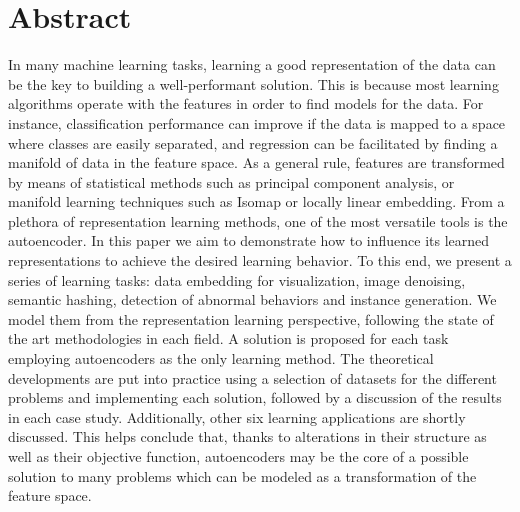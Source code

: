 



\section*{Abstract}
In many machine learning tasks, learning a good representation of the data can be the key to building a well-performant solution. This is because most learning algorithms operate with the features in order to find models for the data. For instance, classification performance can improve if the data is mapped to a space where classes are easily separated, and regression can be facilitated by finding a manifold of data in the feature space. As a general rule, features are transformed by means of statistical methods such as principal component analysis, or manifold learning techniques such as Isomap or locally linear embedding. From a plethora of representation learning methods, one of the most versatile tools is the autoencoder. In this paper we aim to demonstrate how to influence its learned representations to achieve the desired learning behavior. To this end, we present a series of learning tasks: data embedding for visualization, image denoising, semantic hashing, detection of abnormal behaviors and instance generation. We model them from the representation learning perspective, following the state of the art methodologies in each field. A solution is proposed for each task employing autoencoders as the only learning method. The theoretical developments are put into practice using a selection of datasets for the different problems and implementing each solution, followed by a discussion of the results in each case study. Additionally, other six learning applications are shortly discussed. This helps conclude that, thanks to alterations in their structure as well as their objective function, autoencoders may be the core of a possible solution to many problems which can be modeled as a transformation of the feature space.

